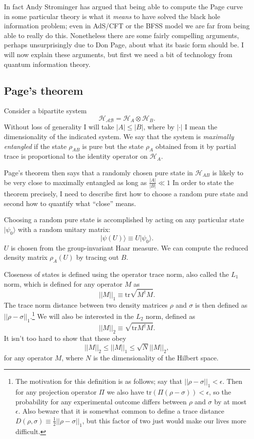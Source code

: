 \documentclass[12pt]{article}
\newcommand{\be}{\begin{equation}}
\newcommand{\ee}{\end{equation}}
\newcommand{\ran}{\rangle}
\begin{document}
In fact Andy Strominger has argued that being able to compute the Page curve in some particular theory is what it \textit{means} to have solved the black hole information problem; even in AdS/CFT or the BFSS model we are far from being able to really do this.  Nonetheless there are some fairly compelling arguments, perhaps unsurprisingly due to Don Page, about what its basic form should be.  I will now explain these arguments, but first we need a bit of technology from quantum information theory.
 
\subsection{Page's theorem}\label{pagesec}
Consider a bipartite system
\be
\mathcal{H_{AB}}=\mathcal{H}_A\otimes \mathcal{H}_B.
\ee
Without loss of generality I will take $|A|\leq |B|$, where by $|\cdot|$ I mean the dimensionality of the indicated system.  We say that the system is \textit{maximally entangled} if the state $\rho_{AB}$ is pure but the state $\rho_A$ obtained from it by partial trace is proportional to the identity operator on $\mathcal{H}_A$.  

Page's theorem \cite{Page:1993df} then says that a randomly chosen pure state in $\mathcal{H}_{AB}$ is likely to be very close to maximally entangled as long as $\frac{|A|}{|B|}\ll1$  In order to state the theorem precisely, I need to describe first how to choose a random pure state and second how to quantify what ``close'' means.  

Choosing a random pure state is accomplished by acting on any particular state $|\psi_0\ran$ with a random unitary matrix:
\be
|\psi(U)\ran\equiv U|\psi_0\ran.  
\ee
$U$ is chosen from the group-invariant Haar measure.  We can compute the reduced density matrix $\rho_A(U)$ by tracing out $B$.  

Closeness of states is defined using the operator trace norm, also called the $L_1$ norm, which is defined for any operator $M$ as
\be
||M||_1\equiv \mathrm{tr} \sqrt{M^\dagger M}.
\ee
The trace norm distance between two density matrices $\rho$ and $\sigma$ is then defined as $||\rho-\sigma||_1$.\footnote{The motivation for this definition is as follows; say that $||\rho-\sigma||_1<\epsilon$.  Then for any projection operator $\Pi$ we also have $\mathrm{tr} \left(\Pi(\rho-\sigma)\right)<\epsilon$, so the probability for any experimental outcome differs between $\rho$ and $\sigma$ by at most $\epsilon$.  Also beware that it is somewhat common to define a trace distance $D(\rho,\sigma)\equiv \frac{1}{2}||\rho-\sigma||_1$, but this factor of two just would make our lives more difficult.}  We will also be interested in the $L_2$ norm, defined as
\be
||M||_2\equiv \sqrt{\mathrm{tr}M^\dagger M}.
\ee
It isn't too hard to show that these obey
\be\label{norms}
||M||_2\leq ||M||_1 \leq \sqrt{N} ||M||_2,
\ee
for any operator $M$, where $N$ is the dimensionality of the Hilbert space.
\end{document}
